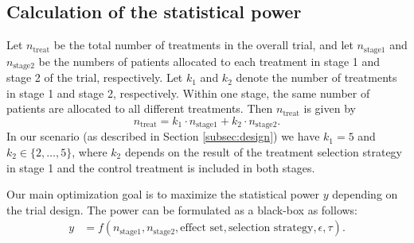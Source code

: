 \documentclass[bimj,fleqn]{w-art}
\theoremstyle{plain}
\theoremstyle{definition}
\begin{document}

\subsection{Calculation of the statistical power}

Let $n_{\text{treat}}$ be the total number of treatments in the overall trial, and let $n_{\text{stage1}}$ and $n_{\text{stage2}}$ be the numbers of patients allocated to each treatment in stage 1 and stage 2 of the trial, respectively. Let $k_1$ and $k_2$ denote the number of treatments in stage 1 and stage 2, respectively. Within one stage, the same number of patients are allocated to all different treatments. Then $n_{\text{treat}}$ is given by
\begin{equation}
  \label{eq:ntreat}
  n_{\text{treat}} = k_1 \cdot n_{\text{stage1}} + k_2 \cdot n_{\text{stage2}}.
\end{equation}
In our scenario (as described in Section \ref{subsec:design}) we have $k_1 = 5$ and $k_2 \in \{2, \ldots, 5\}$, where $k_2$ depends on the result of the treatment selection strategy in stage 1 and the control treatment is included in both stages.

Our main optimization goal is to maximize the statistical power $y$ depending on the trial design. The power can be formulated as a black-box as follows:
\begin{align}
  \label{eq:bbox}
  y & = f(n_{\text{stage1}}, n_{\text{stage2}}, \text{effect set}, \text{selection strategy}, \epsilon, \tau).
\end{align}
\end{document}
